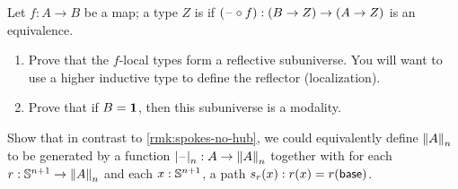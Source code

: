 \documentclass[hott-all.tex]{subfiles}
\begin{document}
\begin{ex}
  Let $f:A\to B$ be a map; a type $Z$ is 
  if $(\blank\circ f):(B\to Z) \to (A\to Z)$ is an equivalence.
  \begin{enumerate}
  \item Prove that the $f$-local types form a reflective subuniverse.
    You will want to use a higher inductive type to define the reflector (localization).
  \item Prove that if $B=\unit$, then this subuniverse is a modality.
  \end{enumerate}
\end{ex}

\begin{ex}
  Show that in contrast to \cref{rmk:spokes-no-hub}, we could equivalently define $\trunc nA$ to be generated by a function $\tprojf n : A \to \trunc n A$ together with for each $r:\Sn^{n+1} \to \trunc n A$ and each $x:\Sn^{n+1}$, a path $s_r(x):r(x) = r(\base)$.
\end{ex}
\end{document}
